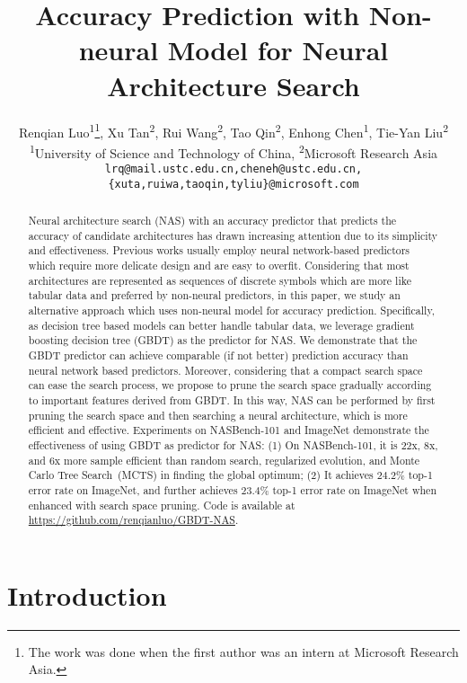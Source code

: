 \documentclass{article}
\title{Accuracy Prediction with Non-neural Model for Neural Architecture Search}
\author{Renqian Luo\textsuperscript{\rm 1}\thanks{The work was done when the first author was an intern at Microsoft Research Asia.}, Xu Tan\textsuperscript{\rm 2}, Rui Wang\textsuperscript{\rm 2}, Tao Qin\textsuperscript{\rm 2}, Enhong Chen\textsuperscript{\rm 1}, Tie-Yan Liu\textsuperscript{\rm 2}\\
  \textsuperscript{\rm 1}University of Science and Technology of China, \textsuperscript{\rm 2}Microsoft Research Asia\\
  \texttt{lrq@mail.ustc.edu.cn,cheneh@ustc.edu.cn,}\\
  \texttt{\{xuta,ruiwa,taoqin,tyliu\}@microsoft.com}
}
\begin{document}
\maketitle

\begin{abstract}
Neural architecture search (NAS) with an accuracy predictor that predicts the accuracy of candidate architectures has drawn increasing attention due to its simplicity and effectiveness. Previous works usually employ neural network-based predictors which require more delicate design and are easy to overfit. Considering that most architectures are represented as sequences of discrete symbols which are more like tabular data and preferred by non-neural predictors, in this paper, we study an alternative approach which uses non-neural model for accuracy prediction. Specifically, as decision tree based models can better handle tabular data, we leverage gradient boosting decision tree (GBDT) as the predictor for NAS. We demonstrate that the GBDT predictor can achieve comparable (if not better) prediction accuracy than neural network based predictors. Moreover, considering that a compact search space can ease the search process, we propose to prune the search space gradually according to important features derived from GBDT. In this way, NAS can be performed by first pruning the search space and then searching a neural architecture, which is more efficient and effective. Experiments on NASBench-101 and ImageNet demonstrate the effectiveness of using GBDT as predictor for NAS: (1) On NASBench-101, it is 22x, 8x, and 6x more sample efficient than random search, regularized evolution, and Monte Carlo Tree Search~(MCTS) in finding the global optimum; (2) It achieves $24.2\%$ top-1 error rate on ImageNet, and further achieves $23.4\%$ top-1 error rate on ImageNet when enhanced with search space pruning. Code is available at \url{https://github.com/renqianluo/GBDT-NAS}.
\end{abstract}

\section{Introduction}
\label{sec:intro}
\end{document}
